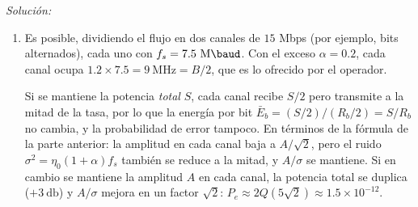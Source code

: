 \documentclass[a4paper,11pt]{article}
\newenvironment{solucion}[1][]{
\noindent \large \textsl{Solución:} \ifthenelse{\equal{#1}{}}{}{\emph{(#1)}}

\smallskip
}{
\bigskip
}
\begin{document}
\begin{solucion}
\begin{enumerate}
\begin{center}
\begin{tikzpicture}
                \end{tikzpicture}
                \end{center}

                El filtro $\hat{H}(f)$ en recepción es un pasabajos (ideal) de ancho $(1+\alpha)f_s/2$.

                La señal demodulada a la entrada del comparador está intacta, por lo que tendrá amplitud $\pm A$. Queda evaluar la potencia del ruido. La densidad espectral del ruido blanco en banda base es $\eta_0$ y al pasar por el pasabajos ideal se tiene $\sigma^2 = \eta_0 (1+\alpha)f_s$. La probabilidad de error queda:
                \begin{equation*}
                        P_e(a_k) = P_e(b_k) = Q\left(\sqrt{\frac{A^2}{\eta_0 (1+\alpha)f_s}}\right) \Rightarrow P_e \approx 2Q\left(\sqrt{\frac{A^2}{\eta_0 (1+\alpha)f_s}}\right)
                \end{equation*}

                Para los valores anteriores, $P_e = 2Q(5) = 5.7 \times 10^{-7}$.

                \item Es posible, dividiendo el flujo en dos canales de $15$ Mbps (por ejemplo, bits alternados), cada uno con $f_s=7.5\ \unit{\mega\baud}$. Con el exceso $\alpha=0.2$, cada canal ocupa $1.2\times 7.5=9\ \unit{\mega\hertz}=B/2$, que es lo ofrecido por el operador.

                Si se mantiene la potencia \emph{total} $S$, cada canal recibe $S/2$ pero transmite a la mitad de la tasa, por lo que la energía por bit $\bar E_b=(S/2)/(R_b/2)=S/R_b$ no cambia, y la probabilidad de error tampoco. En términos de la fórmula de la parte anterior: la amplitud en cada canal baja a $A/\sqrt2$, pero el ruido $\sigma^2=\eta_0(1+\alpha)f_s$ también se reduce a la mitad, y $A/\sigma$ se mantiene. Si en cambio se mantiene la amplitud $A$ en cada canal, la potencia total se duplica ($+3\ \unit{\decibel}$) y $A/\sigma$ mejora en un factor $\sqrt2$: $P_e\approx 2Q(5\sqrt2)\approx 1.5\times10^{-12}$.
        \end{enumerate}
\end{solucion}
\end{document}
